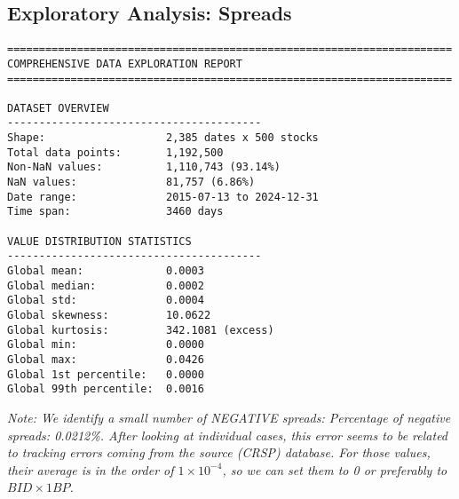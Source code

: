 \documentclass[11pt, letterpaper]{article}
\begin{document}
\subsection{Exploratory Analysis: Spreads}
\begin{verbatim}
======================================================================
COMPREHENSIVE DATA EXPLORATION REPORT
======================================================================

DATASET OVERVIEW
----------------------------------------
Shape:                   2,385 dates x 500 stocks
Total data points:       1,192,500
Non-NaN values:          1,110,743 (93.14%)
NaN values:              81,757 (6.86%)
Date range:              2015-07-13 to 2024-12-31
Time span:               3460 days

VALUE DISTRIBUTION STATISTICS
----------------------------------------
Global mean:             0.0003
Global median:           0.0002
Global std:              0.0004
Global skewness:         10.0622
Global kurtosis:         342.1081 (excess)
Global min:              0.0000
Global max:              0.0426
Global 1st percentile:   0.0000
Global 99th percentile:  0.0016
\end{verbatim}
\textit{Note: We identify a small number of NEGATIVE spreads: Percentage of negative spreads: 0.0212\%. After looking at individual cases, this error seems to be related to tracking errors coming from the source (CRSP) database. For those values, their average is in the order of $1 \times 10^{-4}$, so we can set them to 0 or preferably to $BID \times 1 BP$.}
\end{document}
